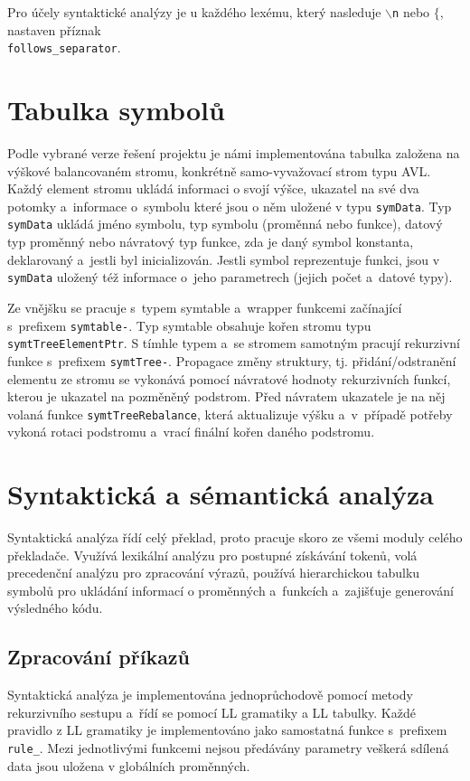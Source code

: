 \documentclass[11pt]{article}
\begin{document}
Pro účely syntaktické analýzy je u každého lexému, který nasleduje \texttt{$\backslash$n} nebo \texttt{$\{$}, nastaven příznak\\ \texttt{follows\_separator}.







\section{Tabulka symbolů}
Podle vybrané verze řešení projektu je námi implementována tabulka založena na výškové balancovaném stromu,
konkrétně samo-vyvažovací strom typu AVL. Každý element stromu ukládá informaci o svojí výšce, ukazatel na své dva potomky a~informace
o~symbolu které jsou o něm uložené v typu \texttt{symData}. Typ \texttt{symData} ukládá jméno symbolu, typ symbolu (proměnná nebo funkce),
datový typ proměnný nebo návratový typ funkce, zda je daný symbol konstanta, deklarovaný a~jestli byl inicializován.
Jestli symbol reprezentuje funkci, jsou v \texttt{symData} uložený též informace o~jeho parametrech (jejich počet a~datové typy).

Ze vnějšku se pracuje s~typem symtable a~wrapper funkcemi začínající s~prefixem \texttt{symtable-}.
Typ symtable obsahuje kořen stromu typu \texttt{symtTreeElementPtr}. S tímhle typem a~se 
stromem samotným pracují rekurzivní funkce s~prefixem \texttt{symtTree-}.
Propagace změny struktury, tj. přidání/odstranění elementu ze stromu se vykonává pomocí návratové
hodnoty rekurzivních funkcí, kterou je ukazatel na pozměněný podstrom.
Před návratem ukazatele je na něj volaná funkce \texttt{symtTreeRebalance}, která aktualizuje výšku a~v~případě
potřeby vykoná rotaci podstromu a~vrací finální kořen daného podstromu.

\section{Syntaktická a sémantická analýza}
Syntaktická analýza řídí celý překlad, proto pracuje skoro ze všemi moduly celého překladače.
Využívá lexikální analýzu pro postupné získávání tokenů, volá precedenční analýzu pro zpracování
výrazů, používá hierarchickou tabulku symbolů pro ukládání informací o proměnných a~funkcích a~zajišťuje generování výsledného kódu.


\subsection{Zpracování příkazů}
Syntaktická analýza je implementována jednoprůchodově pomocí metody rekurzivního sestupu
a~řídí se pomocí LL gramatiky a LL tabulky. Každé pravidlo z LL gramatiky je implementováno
jako samostatná funkce s~prefixem \texttt{rule\_}. 
Mezi jednotlivými funkcemi nejsou předávány parametry veškerá sdílená data jsou uložena v globálních proměnných.
\end{document}
